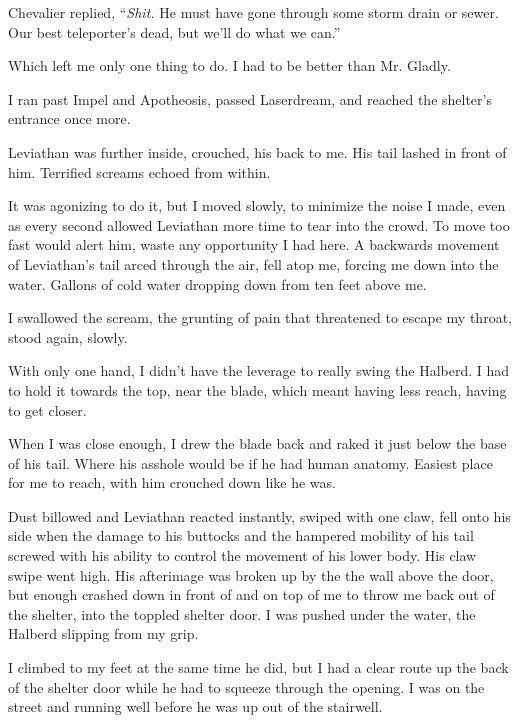 Chevalier replied, ``\emph{Shit.  }He must have gone through some storm drain or sewer.  Our best teleporter's dead, but we'll do what we can.''



Which left me only one thing to do.  I had to be better than Mr. Gladly.



I ran past Impel and Apotheosis, passed Laserdream, and reached the shelter's entrance once more.



Leviathan was further inside, crouched, his back to me.  His tail lashed in front of him.  Terrified screams echoed from within.



It was agonizing to do it, but I moved slowly, to minimize the noise I made, even as every second allowed Leviathan more time to tear into the crowd.  To move too fast would alert him, waste any opportunity I had here.  A backwards movement of Leviathan's tail arced through the air, fell atop me, forcing me down into the water.  Gallons of cold water dropping down from ten feet above me.



I swallowed the scream, the grunting of pain that threatened to escape my throat, stood again, slowly.



With only one hand, I didn't have the leverage to really swing the Halberd.  I had to hold it towards the top, near the blade, which meant having less reach, having to get closer.



When I was close enough, I drew the blade back and raked it just below the base of his tail.  Where his asshole would be if he had human anatomy.  Easiest place for me to reach, with him crouched down like he was.



Dust billowed and Leviathan reacted instantly, swiped with one claw, fell onto his side when the damage to his buttocks and the hampered mobility of his tail screwed with his ability to control the movement of his lower body.  His claw swipe went high.  His afterimage was broken up by the the wall above the door, but enough crashed down in front of and on top of me to throw me back out of the shelter, into the toppled shelter door.  I was pushed under the water, the Halberd slipping from my grip.



I climbed to my feet at the same time he did, but I had a clear route up the back of the shelter door while he had to squeeze through the opening.  I was on the street and running well before he was up out of the stairwell.



